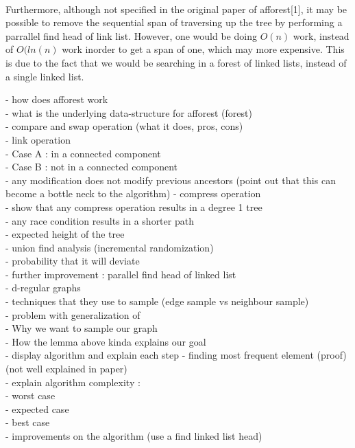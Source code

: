 \documentclass[]{article}
\begin{document}
\paragraph{}
Furthermore, although not specified in the original paper of afforest[1], it may be possible to remove the sequential span of traversing up the tree by performing a parrallel find head of link list. However, one would be doing $O(n)$ work, instead of $O(ln(n)$ work inorder to get a span of one, which may more expensive. This is due to the fact that we would be searching in a forest of linked lists, instead of a single linked list.


 - how does afforest work\\
 - what is the underlying data-structure for afforest (forest)\\
 - compare and swap operation (what it does, pros, cons)\\
 - link operation\\
 - Case A : in a connected component\\
 - Case B : not in a connected component\\
 - any modification does not modify previous ancestors (point out that this can\\ become a bottle neck to the algorithm)
 - compress operation\\
 - show that any compress operation results in a degree 1 tree\\
 - any race condition results in a shorter path\\
 - expected height of the tree\\
 - union find analysis (incremental randomization) \\
 - probability that it will deviate \\
 - further improvement : parallel find head of linked list\\
 - d-regular graphs\\
 - techniques that they use to sample (edge sample vs neighbour sample)\\
 - problem with generalization of\\
 - Why we want to sample our graph\\
 - How the lemma above kinda explains our goal\\
 - display algorithm and explain each step
 - finding most frequent element (proof) (not well explained in paper)\\
 - explain algorithm complexity :\\
    - worst case\\
    - expected case\\
    - best case\\
- improvements on the algorithm (use a find linked list head)\\
 
\end{document}
